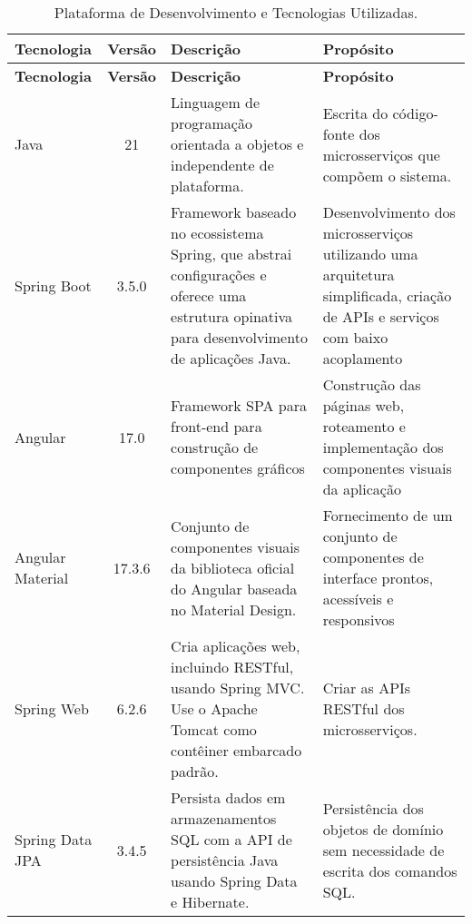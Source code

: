 \begin{footnotesize}
\begin{longtable}{|p{1.8cm}|c|p{5cm}|p{6.3cm}|}
	\caption{Plataforma de Desenvolvimento e Tecnologias Utilizadas.}	
	\label{tabela-plataforma}\\\hline

	\rowcolor{lightgray}
	\textbf{Tecnologia} & \textbf{Versão} & \textbf{Descrição} & \textbf{Propósito} \\\hline 
	\endfirsthead
	\hline
	\rowcolor{lightgray}
	\textbf{Tecnologia} & \textbf{Versão} & \textbf{Descrição} & \textbf{Propósito} \\\hline 
	\endhead
		

	Java & 21 & Linguagem de programação orientada a objetos e independente de plataforma. & Escrita do código-fonte dos microsserviços que compõem o sistema. \\\hline

    Spring Boot & 3.5.0 & Framework baseado no ecossistema Spring, que abstrai configurações e oferece uma estrutura opinativa para desenvolvimento de aplicações Java. & Desenvolvimento dos microsserviços utilizando uma arquitetura simplificada, criação de APIs e serviços com baixo acoplamento \\\hline
	
	Angular & 17.0 &  Framework SPA para front-end para construção de componentes gráficos  & Construção das páginas web, roteamento e implementação dos componentes visuais da aplicação  \\\hline  
	
	Angular Material  & 17.3.6 & Conjunto de componentes visuais da biblioteca oficial do Angular baseada no Material Design. & Fornecimento de um conjunto de componentes de interface prontos, acessíveis e responsivos \\\hline

    Spring Web & 6.2.6 & Cria aplicações web, incluindo RESTful, usando Spring MVC. Use o Apache Tomcat como contêiner embarcado padrão. & Criar as APIs RESTful dos microsserviços. \\\hline
	
    Spring Data JPA & 3.4.5 & Persista dados em armazenamentos SQL com a API de persistência Java usando Spring Data e Hibernate. & Persistência dos objetos de domínio sem necessidade de escrita dos comandos SQL. \\\hline


\end{longtable}
\end{footnotesize}
